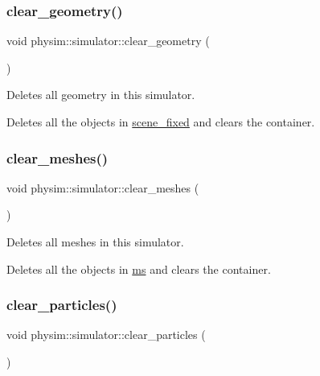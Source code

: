 \subsubsection{\texorpdfstring{clear\+\_\+geometry()}{clear\_geometry()}}
{\footnotesize\ttfamily void physim\+::simulator\+::clear\+\_\+geometry (\begin{DoxyParamCaption}{ }\end{DoxyParamCaption})}



Deletes all geometry in this simulator. 

Deletes all the objects in \hyperlink{classphysim_1_1simulator_a7ea652d4a55986d0c2cf527e40495fd8}{scene\+\_\+fixed} and clears the container. \mbox{\label{classphysim_1_1simulator_a050e1ddeece122406b045262e40d4063}} 
\subsubsection{\texorpdfstring{clear\+\_\+meshes()}{clear\_meshes()}}
{\footnotesize\ttfamily void physim\+::simulator\+::clear\+\_\+meshes (\begin{DoxyParamCaption}{ }\end{DoxyParamCaption})}



Deletes all meshes in this simulator. 

Deletes all the objects in \hyperlink{classphysim_1_1simulator_ae2bcb1ad81b487abd2ad00b0118d2f51}{ms} and clears the container. \mbox{\label{classphysim_1_1simulator_ade81dc85cbad0e86fc38b29f48fedcd6}} 
\subsubsection{\texorpdfstring{clear\+\_\+particles()}{clear\_particles()}}
{\footnotesize\ttfamily void physim\+::simulator\+::clear\+\_\+particles (\begin{DoxyParamCaption}{ }\end{DoxyParamCaption})}



